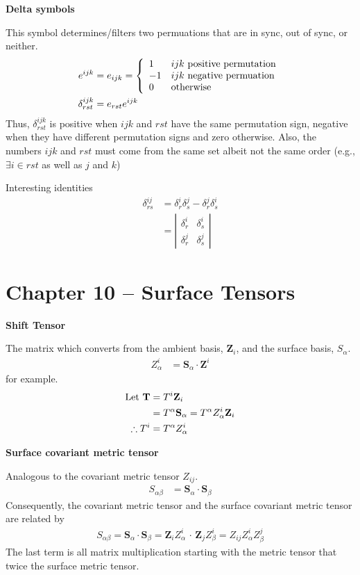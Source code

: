 \documentclass[12pt,a4paper]{report}
\begin{document}
\begin{description}
	\item \textbf{Delta symbols}
	
	This symbol determines/filters two permuations that are in sync, out of sync, or neither.
	\begin{align*}
		e^{ijk} &= e_{ijk} = \left \{ \begin{array}{ll} 1 & ijk \text{ positive permutation}\\ -1 & ijk \text{ negative permuation} \\ 0 & \text{otherwise} \end{array} \right . \\
		\delta_{rst}^{ijk} &= e_{rst}e^{ijk}
	\end{align*}Thus, $\delta_{rst}^{ijk}$ is positive when $ijk$ and $rst$ have the same permutation sign, negative when they have different permutation signs and zero otherwise.  Also, the numbers $ijk$ and $rst$ must come from the same set albeit not the same order (e.g., $\exists i \in rst$ as well as $j$ and $k$)
	
	Interesting identities
	\begin{align*}
		\delta_{rs}^{ij} &= \delta_r^i\delta_s^j - \delta_r^j\delta_s^i \\
		&= \left | \begin{array}{cc}
			\delta_r^i & \delta_s^i \\
			\delta_r^j & \delta_s^j
		\end{array} \right |
	\end{align*}
	
	\HLINE
	\section*{Chapter 10 -- Surface Tensors}
	\item \textbf{Shift Tensor}
	
	The matrix which converts from the ambient basis, $\textbf{Z}_i$, and the surface basis, $S_\alpha$.
	\begin{align*}
		Z_\alpha^i &= \textbf{S}_\alpha \cdot \textbf{Z}^i
	\end{align*}for example. 
	\begin{align*}
		\text{Let } \textbf{T} &= T^i\textbf{Z}_i \\
			&= T^\alpha\textbf{S}_\alpha = T^\alpha Z_\alpha^i\textbf{Z}_i \\
			\therefore T^i &= T^\alpha Z_\alpha^i
	\end{align*}
	
	\item \textbf{Surface covariant metric tensor}
	
	Analogous to the covariant metric tensor $Z_{ij}$.
	\begin{align*}
		S_{\alpha\beta} &= \textbf{S}_\alpha \cdot \textbf{S}_\beta
	\end{align*}Consequently, the covariant metric tensor and the surface covariant metric tensor are related by 
	\begin{align*}
		S_{\alpha\beta} = \textbf{S}_\alpha\cdot\textbf{S}_\beta = \textbf{Z}_i Z_\alpha^i\,\cdot\,\textbf{Z}_j Z_\beta^i = Z_{ij}Z_\alpha^i Z_\beta^j
	\end{align*}The last term is all matrix multiplication starting with the metric tensor that twice the surface metric tensor.
	

\end{description}
\end{document}
